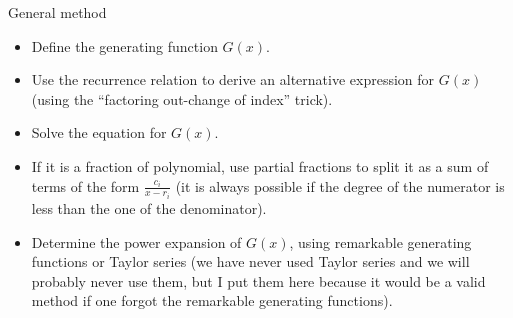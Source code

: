 \documentclass[a4paper]{article}
\begin{document}
\begin{parag}{General method}
    \begin{itemize}[left=0pt]
        \item Define the generating function $G\left(x\right)$.
        \item Use the recurrence relation to derive an alternative expression for $G\left(x\right)$ (using the ``factoring out-change of index'' trick).
        \item Solve the equation for $G\left(x\right)$. 
        \item If it is a fraction of polynomial, use partial fractions to split it as a sum of terms of the form $\frac{c_i}{x - r_i}$ (it is always possible if the degree of the numerator is less than the one of the denominator). 
        \item Determine the power expansion of $G\left(x\right)$, using remarkable generating functions or Taylor series (we have never used Taylor series and we will probably never use them, but I put them here because it would be a valid method if one forgot the remarkable generating functions).
    \end{itemize}
\end{parag}
\end{document}
